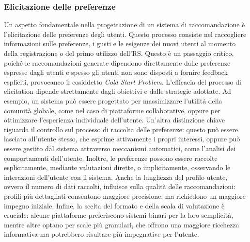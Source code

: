 \documentclass{report}
\begin{document}
	\subsubsection{Elicitazione delle preferenze}
	Un aspetto fondamentale nella progettazione di un sistema di raccomandazione è l'elicitazione delle preferenze degli utenti. Questo processo consiste nel raccogliere informazioni sulle preferenze, i gusti e le esigenze dei nuovi utenti al momento della registrazione o del primo utilizzo dell'RS. Questo è un passaggio critico, poiché le raccomandazioni generate dipendono direttamente dalle preferenze espresse dagli utenti e spesso gli utenti non sono disposti a fornire feedback espliciti, provocanco il cosiddetto \textit{Cold Start Problem}.
	L'efficacia del processo di elicitation dipende strettamente dagli obiettivi e dalle strategie adottate. Ad esempio, un sistema può essere progettato per massimizzare l'utilità della comunità globale, come nel caso di piattaforme collaborative, oppure per ottimizzare l'esperienza individuale dell'utente. Un'altra distinzione chiave riguarda il controllo sul processo di raccolta delle preferenze: questo può essere lasciato all'utente stesso, che esprime attivamente i propri interessi, oppure può essere gestito dal sistema attraverso meccanismi automatici, come l'analisi dei comportamenti dell'utente. Inoltre, le preferenze possono essere raccolte esplicitamente, mediante valutazioni dirette, o implicitamente, osservando le interazioni dell'utente con il sistema. Anche la lunghezza del profilo utente, ovvero il numero di dati raccolti, influisce sulla qualità delle raccomandazioni: profili più dettagliati consentono maggiore precisione, ma richiedono un maggiore impegno iniziale. Infine, la scelta del formato e della scala di valutazione è cruciale: alcune piattaforme preferiscono sistemi binari per la loro semplicità, mentre altre optano per scale più granulari, che offrono una maggiore ricchezza informativa ma potrebbero risultare più impegnative per l'utente.
\end{document}
